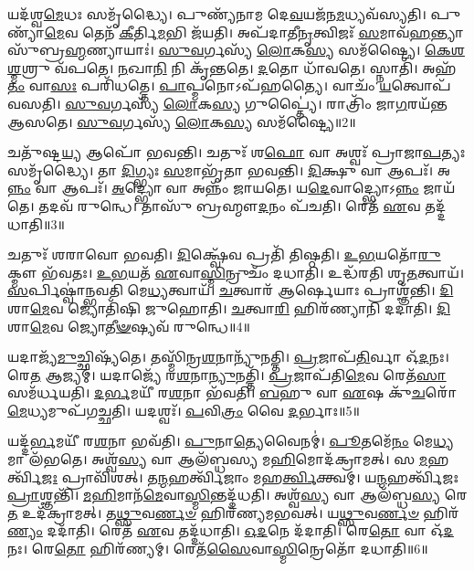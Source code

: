 𑌯𑌦᳴𑌶𑍍𑌵\-\ul{𑌮𑍇}\-𑌧𑌃 𑌸𑌮𑍃᳴𑌦𑍍𑌧𑍍𑌯𑍈।
𑌪𑍁𑌣𑍍𑌯᳴𑌨𑌾𑌮 𑌦𑍇\-\ul{𑌵}\-𑌯𑌜᳴𑌨\-\ul{𑌮}\-𑌧𑍍𑌯𑌵᳴𑌸𑍍𑌯𑌤𑌿।
𑌪𑍁𑌣𑍍𑌯𑌾᳴\-\ul{𑌮𑍇}\-𑌵 𑌤𑍇𑌨᳴ \ul{𑌕𑍀}\-𑌰𑍍𑌤𑌿\-\ul{𑌮}\-𑌭𑌿 𑌜᳴𑌯𑌤𑌿।
𑌅𑌪᳴𑌦𑌾𑌤𑍀\-\ul{𑌨𑍃}\-𑌤𑍍𑌵𑌿𑌜𑌃᳴ \ul{𑌸}\-𑌮𑌾𑌵᳴\-\ul{𑌹}\-𑌨𑍍𑌤𑍍𑌯𑌾 𑌸𑍁᳴𑌬𑍍𑌰\-\ul{𑌹𑍍𑌮}\-𑌣𑍍𑌯𑌾𑌯𑌾𑌃॑।
\-\ul{𑌸𑍁}\-\-\ul{𑌵}\-𑌰𑍍𑌗𑌸𑍍𑌯᳴ \ul{𑌲𑍋}\-𑌕\-\ul{𑌸𑍍𑌯} 𑌸𑌮᳴𑌷𑍍𑌟𑍍𑌯𑍈।
\-\ul{𑌕𑍇}\-\-\ul{𑌶}\-\-\ul{𑌶𑍍𑌮}\-𑌶𑍍𑌰𑍁 𑌵᳴𑌪𑌤𑍇।
\-\ul{𑌨}\-𑌖𑌾\-\ul{𑌨𑌿} 𑌨𑌿 𑌕𑍃᳴𑌨𑍍𑌤𑌤𑍇।
\-\ul{𑌦}\-𑌤𑍋 𑌧𑌾᳴𑌵𑌤𑍇।
𑌸𑍍𑌨𑌾𑌤𑌿᳴।
𑌅𑌹᳴\-\ul{𑌤𑌂} 𑌵𑌾\-\ul{𑌸𑌃} 𑌪𑌰𑌿᳴𑌧𑌤𑍍𑌤𑍇।
\-\ul{𑌪𑌾}\-𑌪𑍍𑌮𑌨𑍋\-𑌽𑌪᳴𑌹𑌤𑍍𑌯𑍈।
𑌵𑌾𑌚𑌂᳴ \ul{𑌯}\-𑌤𑍍𑌵𑍋𑌪᳴ 𑌵𑌸𑌤𑌿।
\-\ul{𑌸𑍁}\-\-\ul{𑌵}\-𑌰𑍍𑌗𑌸𑍍𑌯᳴ \ul{𑌲𑍋}\-𑌕\-\ul{𑌸𑍍𑌯} 𑌗𑍁𑌪𑍍𑌤𑍍𑌯𑍈॑।
𑌰𑌾𑌤𑍍𑌰𑌿𑌂᳴ 𑌜𑌾\-\ul{𑌗}\-𑌰𑌯᳴𑌨𑍍𑌤 𑌆𑌸𑌤𑍇।
\-\ul{𑌸𑍁}\-\-\ul{𑌵}\-𑌰𑍍𑌗𑌸𑍍𑌯᳴ \ul{𑌲𑍋}\-𑌕\-\ul{𑌸𑍍𑌯} 𑌸𑌮᳴𑌷𑍍𑌟𑍍𑌯𑍈॥2॥\anuvakamend[𑌕𑌰𑍍𑌮᳴ 𑌧\-\ul{𑌤𑍍𑌤𑍇} 𑌪𑌞𑍍𑌚᳴ 𑌚]

𑌚𑌤𑍁᳴𑌷𑍍𑌟\-\ul{𑌯𑍍𑌯} 𑌆𑌪𑍋᳴ 𑌭𑌵𑌨𑍍𑌤𑌿।
𑌚𑌤𑍁𑌃᳴ 𑌶\-\ul{𑌫𑍋} 𑌵𑌾 𑌅𑌶𑍍𑌵𑌃᳴ 𑌪𑍍𑌰𑌾𑌜𑌾\-\ul{𑌪}\-𑌤𑍍𑌯𑌃 𑌸𑌮𑍃᳴𑌦𑍍𑌧𑍍𑌯𑍈।
𑌤𑌾 \ul{𑌦𑌿}\-𑌗𑍍𑌭𑍍𑌯𑌃 \ul{𑌸}\-𑌮𑌾𑌭𑍃᳴𑌤𑌾 𑌭𑌵𑌨𑍍𑌤𑌿।
\-\ul{𑌦𑌿}\-𑌕𑍍𑌷𑍁 𑌵𑌾 𑌆𑌪𑌃᳴।
𑌅\-\ul{𑌨𑍍𑌨𑌂} 𑌵𑌾 𑌆𑌪𑌃᳴।
\-\ul{𑌅}\-𑌦𑍍𑌭𑍍𑌯𑍋 𑌵𑌾 𑌅𑌨𑍍𑌨𑌂᳴ 𑌜𑌾𑌯𑌤𑍇।
𑌯\-\ul{𑌦𑍇}\-𑌵𑌾𑌦𑍍𑌭𑍍𑌯𑍋\-𑌽\-\ul{𑌨𑍍𑌨𑌂} 𑌜𑌾𑌯᳴𑌤𑍇।
𑌤𑌦𑌵᳴ 𑌰𑍁𑌨𑍍𑌧𑍇।
𑌤𑌾𑌸𑍁᳴ 𑌬𑍍𑌰𑌹𑍍𑌮𑍗\-\ul{𑌦}\-𑌨𑌂 𑌪᳴𑌚𑌤𑌿।
𑌰𑍇𑌤᳴ \ul{𑌏}\-𑌵 𑌤𑌦𑍍𑌦᳴𑌧𑌾𑌤𑌿॥3॥

𑌚𑌤𑍁𑌃᳴ 𑌶𑌰𑌾𑌵𑍋 𑌭𑌵𑌤𑌿।
\-\ul{𑌦𑌿}\-𑌕𑍍𑌷𑍍𑌵𑍇᳴𑌵 𑌪𑍍𑌰𑌤𑌿᳴ 𑌤𑌿𑌷𑍍𑌠𑌤𑌿।
\-\ul{𑌉}\-\-\ul{𑌭}\-𑌯𑌤𑍋᳴\-\ul{𑌰𑍁}\-𑌕𑍍𑌮𑍗 𑌭᳴𑌵𑌤𑌃।
\-\ul{𑌉}\-\-\ul{𑌭}\-𑌯𑌤᳴ \ul{𑌏}\-𑌵𑌾\-\ul{𑌸𑍍𑌮𑌿}\-𑌨𑍍𑌰𑍁𑌚𑌂᳴ 𑌦𑌧𑌾𑌤𑌿।
𑌉𑌦𑍍𑌧᳴𑌰𑌤𑌿 𑌶𑍃\-\ul{𑌤}\-𑌤𑍍𑌵𑌾𑌯᳴।
\-\ul{𑌸}\-𑌰𑍍𑌪𑌿𑌷𑍍𑌵𑌾॑𑌨𑍍𑌭𑌵𑌤𑌿 𑌮𑍇\-\ul{𑌧𑍍𑌯}\-𑌤𑍍𑌵𑌾𑌯᳴।
\-\ul{𑌚}\-𑌤𑍍𑌵𑌾𑌰᳴ 𑌆𑌰𑍍\mbox{}\-\ul{𑌷𑍇}\-𑌯𑌾𑌃 𑌪𑍍𑌰𑌾𑌶𑍍𑌞᳴𑌨𑍍𑌤𑌿।
\-\ul{𑌦𑌿}\-𑌶𑌾\-\ul{𑌮𑍇}\-𑌵 𑌜𑍍𑌯𑍋𑌤𑌿᳴𑌷𑌿 𑌜𑍁𑌹𑍋𑌤𑌿।
\-\ul{𑌚}\-𑌤𑍍𑌵𑌾\-\ul{𑌰𑌿} 𑌹𑌿𑌰᳴𑌣𑍍𑌯𑌾𑌨𑌿 𑌦𑌦𑌾𑌤𑌿।
\-\ul{𑌦𑌿}\-𑌶𑌾\-\ul{𑌮𑍇}\-𑌵 𑌜𑍍𑌯𑍋\-\ul{𑌤𑍀}\-\-\ul{𑍟}\-𑌷𑍍𑌯𑌵᳴ 𑌰𑍁𑌨𑍍𑌧𑍇॥4॥

𑌯𑌦𑌾𑌜𑍍𑌯᳴\-\ul{𑌮𑍁}\-𑌚𑍍𑌛𑌿𑌷𑍍𑌯᳴𑌤𑍇।
𑌤𑌸𑍍𑌮𑌿᳴𑌨𑍍𑌰\-\ul{𑌶}\-𑌨𑌾𑌨𑍍𑌯𑍁᳴𑌨𑌤𑍍𑌤𑌿।
\-\ul{𑌪𑍍𑌰}\-𑌜𑌾𑌪᳴\-\ul{𑌤𑌿}\-𑌰𑍍𑌵𑌾 𑌓᳴\-\ul{𑌦}\-𑌨𑌃।
𑌰𑍇\-\ul{𑌤} 𑌆𑌜𑍍𑌯𑌮𑍍॑।
𑌯𑌦𑌾𑌜𑍍𑌯𑍇᳴ 𑌰\-\ul{𑌶}\-𑌨𑌾\-\ul{𑌨𑍍𑌯𑍁}\-𑌨𑌤𑍍𑌤𑌿᳴।
\-\ul{𑌪𑍍𑌰}\-𑌜𑌾𑌪᳴𑌤𑌿\-\ul{𑌮𑍇}\-𑌵 𑌰𑍇𑌤᳴\-\ul{𑌸𑌾} 𑌸𑌮᳴𑌰𑍍𑌧𑌯𑌤𑌿।
\-\ul{𑌦}\-\-\ul{𑌰𑍍𑌭}\-𑌮𑌯𑍀᳴ 𑌰\-\ul{𑌶}\-𑌨𑌾 𑌭᳴𑌵𑌤𑌿।
\-\ul{𑌬}\-𑌹𑍁 𑌵𑌾 \ul{𑌏}\-𑌷 𑌕𑍁᳴\-\ul{𑌚}\-𑌰𑍋᳴ \ul{𑌮𑍇}\-𑌧𑍍𑌯𑌮𑍁𑌪᳴𑌗𑌚𑍍𑌛𑌤𑌿।
𑌯𑌦𑌶𑍍𑌵𑌃᳴।
\-\ul{𑌪}\-𑌵𑌿\-\ul{𑌤𑍍𑌰𑌂} 𑌵𑍈 \ul{𑌦}\-𑌰𑍍𑌭𑌾𑌃॥5॥

𑌯𑌦𑍍𑌦᳴\-\ul{𑌰𑍍𑌭}\-𑌮𑌯𑍀᳴ 𑌰\-\ul{𑌶}\-𑌨𑌾 𑌭𑌵᳴𑌤𑌿।
\-\ul{𑌪𑍁}\-𑌨𑌾\-\ul{𑌤𑍍𑌯𑍇}\-𑌵𑍈𑌨𑌮𑍍॑।
\-\ul{𑌪𑍂}\-𑌤𑌮𑍇᳴\-\ul{𑌨𑌂} 𑌮𑍇\-\ul{𑌧𑍍𑌯}\-𑌮𑌾 𑌲᳴𑌭𑌤𑍇।
𑌅𑌶𑍍𑌵᳴\-\ul{𑌸𑍍𑌯} 𑌵𑌾 𑌆𑌲᳴𑌬𑍍𑌧𑌸𑍍𑌯 𑌮\-\ul{𑌹𑌿}\-𑌮𑍋𑌦᳴𑌕𑍍𑌰𑌾𑌮𑌤𑍍।
𑌸 \ul{𑌮}\-𑌹𑌰𑍍𑌤𑍍𑌵𑌿᳴\-\ul{𑌜𑌃} 𑌪𑍍𑌰𑌾𑌵𑌿᳴𑌶𑌤𑍍।
𑌤\-\ul{𑌨𑍍𑌮}\-𑌹𑌰𑍍𑌤𑍍𑌵𑌿᳴𑌜𑌾𑌂 𑌮𑌹\-\ul{𑌰𑍍𑌤𑍍𑌵𑌿}\-𑌕𑍍𑌤𑍍𑌵𑌮𑍍।
𑌯\-\ul{𑌨𑍍𑌮}\-𑌹𑌰𑍍𑌤𑍍𑌵𑌿᳴𑌜𑌃 \ul{𑌪𑍍𑌰𑌾}\-𑌶𑍍𑌞𑌨𑍍𑌤𑌿᳴।
\-\ul{𑌮}\-\-\ul{𑌹𑌿}\-𑌮𑌾𑌨᳴\-\ul{𑌮𑍇}\-𑌵𑌾\-\ul{𑌸𑍍𑌮𑌿}\-𑌨𑍍𑌤𑌦𑍍𑌦᳴𑌧𑌤𑌿।
𑌅𑌶𑍍𑌵᳴\-\ul{𑌸𑍍𑌯} 𑌵𑌾 𑌆𑌲᳴𑌬𑍍𑌧\-\ul{𑌸𑍍𑌯} 𑌰𑍇\-\ul{𑌤} 𑌉𑌦᳴𑌕𑍍𑌰𑌾𑌮𑌤𑍍।
𑌤\-\ul{𑌥𑍍𑌸𑍁}\-𑌵\-\ul{𑌰𑍍𑌣}\-\-\ul{𑍞} 𑌹𑌿𑌰᳴𑌣𑍍𑌯𑌮𑌭𑌵𑌤𑍍।
𑌯\-\ul{𑌥𑍍𑌸𑍁}\-𑌵\-\ul{𑌰𑍍𑌣}\-\-\ul{𑍞} 𑌹𑌿𑌰᳴\-\ul{𑌣𑍍𑌯𑌂} 𑌦𑌦𑌾᳴𑌤𑌿।
𑌰𑍇𑌤᳴ \ul{𑌏}\-𑌵 𑌤𑌦𑍍𑌦᳴𑌧𑌾𑌤𑌿।
\-\ul{𑌓}\-\-\ul{𑌦}\-𑌨𑍇 𑌦᳴𑌦𑌾𑌤𑌿।
𑌰𑍇\-\ul{𑌤𑍋} 𑌵𑌾 𑌓᳴\-\ul{𑌦}\-𑌨𑌃।
𑌰𑍇\-\ul{𑌤𑍋} 𑌹𑌿𑌰᳴𑌣𑍍𑌯𑌮𑍍।
𑌰𑍇𑌤᳴\-\ul{𑌸𑍈}\-𑌵𑌾\-\ul{𑌸𑍍𑌮𑌿}\-𑌨𑍍𑌰𑍇𑌤𑍋᳴ 𑌦𑌧𑌾𑌤𑌿॥6॥\anuvakamend[\-\ul{𑌦}\-\-\ul{𑌧𑌾}\-\-\ul{𑌤𑌿} \ul{𑌰𑍁}\-\-\ul{𑌨𑍍𑌧𑍇} \ul{𑌦}\-𑌰𑍍𑌭𑌾 𑌅᳴𑌭\-\ul{𑌵}\-𑌥𑍍𑌷𑌟𑍍 𑌚᳴]

